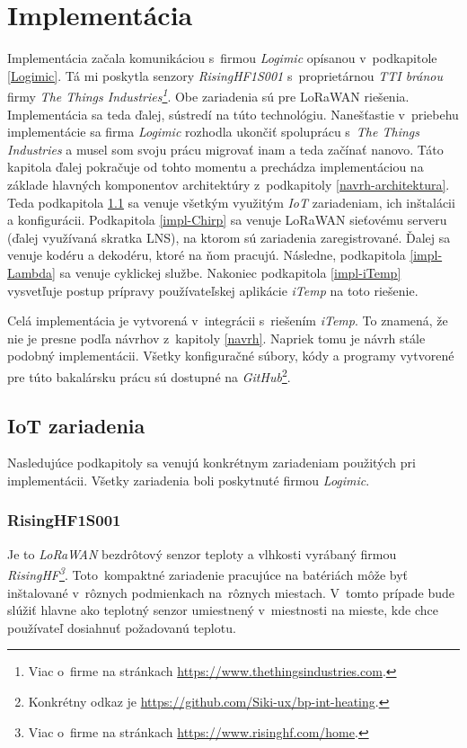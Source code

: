 \chapter{Implementácia}\label{impl}
Implementácia začala komunikáciou s~firmou \emph{Logimic} opísanou v~podkapitole \ref{Logimic}. Tá mi poskytla senzory \emph{RisingHF1S001} s~proprietárnou \emph{TTI bránou} firmy \emph{The Things Industries\footnote{Viac o~firme na stránkach \url{https://www.thethingsindustries.com}.}}. 
Obe zariadenia sú pre LoRaWAN riešenia. 
Implementácia sa teda ďalej, sústredí na túto technológiu. 
Nanešťastie v~priebehu implementácie sa firma \emph{Logimic} rozhodla ukončiť spoluprácu s~\emph{The Things Industries} a musel som svoju prácu migrovať inam a teda začínať nanovo. 
Táto kapitola ďalej pokračuje od tohto momentu a prechádza implementáciou na základe hlavných komponentov architektúry z~podkapitoly \ref{navrh-architektura}. 
Teda podkapitola \ref{impl-IOT} sa venuje všetkým využitým \emph{IoT} zariadeniam, ich inštalácii a konfigurácii. 
Podkapitola \ref{impl-Chirp} sa venuje LoRaWAN sieťovému serveru (ďalej využívaná skratka LNS), na ktorom sú zariadenia zaregistrované. 
Ďalej sa venuje kodéru a dekodéru, ktoré na ňom pracujú. 
Následne, podkapitola \ref{impl-Lambda} sa venuje cyklickej službe. Nakoniec podkapitola \ref{impl-iTemp} vysvetľuje postup prípravy používateľskej aplikácie \emph{iTemp} na toto riešenie.

Celá implementácia je vytvorená v~integrácii s~riešením \emph{iTemp}. To znamená, že nie je presne podľa návrhov z~kapitoly \ref{navrh}. 
Napriek tomu je návrh stále podobný implementácii. Všetky konfiguračné súbory, kódy a programy vytvorené pre túto bakalársku prácu sú dostupné na \emph{GitHub}\footnote{Konkrétny odkaz je \url{https://github.com/Siki-ux/bp-int-heating}.}.


\section{IoT zariadenia}\label{impl-IOT}
Nasledujúce podkapitoly sa venujú konkrétnym zariadeniam použitých pri implementácii. Všetky zariadenia boli poskytnuté firmou \emph{Logimic}.
\subsection{RisingHF1S001}\label{impl-Rising}
Je to \emph{LoRaWAN} bezdrôtový senzor teploty a vlhkosti vyrábaný firmou \emph{RisingHF\footnote{Viac o~firme na stránkach \url{https://www.risinghf.com/home}.}}. 
Toto~kompaktné zariadenie pracujúce na batériách môže byť inštalované v~rôznych podmienkach na~rôznych miestach. 
V~tomto prípade bude slúžiť hlavne ako teplotný senzor umiestnený v~miestnosti na mieste, kde chce používateľ dosiahnuť požadovanú teplotu.
